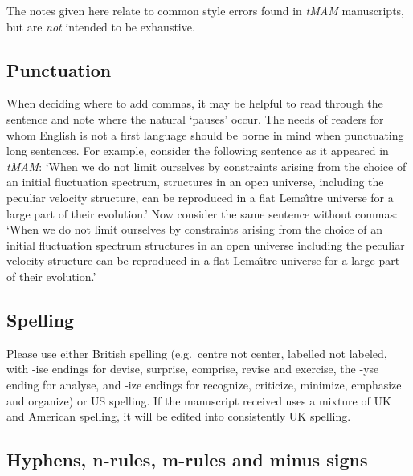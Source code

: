 \documentclass[]{tMAM2e}
\begin{document}
The notes given here relate to common style errors found in  {{\it
tMAM}} manuscripts, but are {\itshape not\/} intended to be
exhaustive.

\subsection{Punctuation}

When  deciding  where to add commas, it may be  helpful  to  read
through  the sentence and note where the natural `pauses'  occur.
The  needs  of readers for whom English is not a  first  language
should  be  borne in mind when punctuating  long  sentences.  For
example, consider the following sentence as it appeared in {\it
tMAM}: `When we do not limit ourselves by constraints arising from
the choice of an initial fluctuation spectrum, structures in an open
universe, including the peculiar velocity structure,  can be
reproduced  in a flat Lema\^{\i}tre universe for a large  part of
their evolution.' Now consider the same sentence without commas:
`When  we do not limit ourselves by constraints arising from  the
choice  of an initial fluctuation spectrum structures in an  open
universe including the peculiar velocity structure can be reproduced
in  a  flat Lema\^{\i}tre universe for a large  part of  their
evolution.'

\subsection{Spelling}

Please use either British spelling (e.g.\ centre not center, labelled not  labeled, with -ise endings for devise,  surprise, comprise, revise and exercise, the -yse ending for analyse, and -ize endings for recognize, criticize, minimize, emphasize and organize) or US spelling. If the manuscript received uses a mixture of UK and American spelling, it will be edited into consistently UK spelling.

\subsection{Hyphens, n-rules, m-rules and minus signs}
\end{document}
